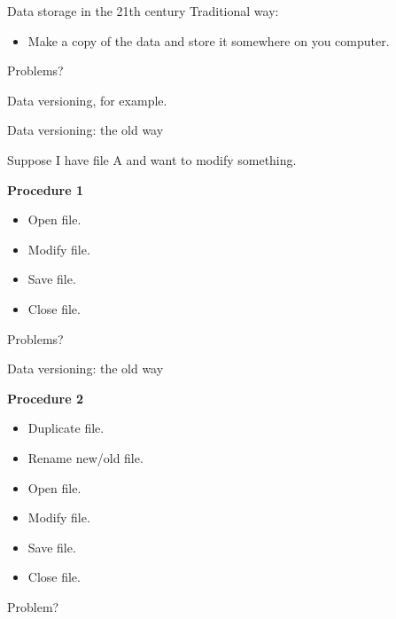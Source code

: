 \documentclass{beamer}
\begin{document}
\begin{frame}{Data storage in the 21th century}
  Traditional way:
  
    \begin{itemize}
      \item Make a copy of the data and store it somewhere on you computer.
    \end{itemize}
 
  \pause
  
  Problems?
  
  {\tiny Data versioning, for example.}

\end{frame}

\begin{frame}{Data versioning: the old way}

  Suppose I have file A and want to modify something.
  
  \textbf{Procedure 1}

  \begin{itemize}
  
    \item Open file.
    \item Modify file.
    \item Save file.
    \item Close file.
  
  \end{itemize}

  Problems?
  
\end{frame}
  
\begin{frame}{Data versioning: the old way}

  \textbf{Procedure 2}
  
  \begin{itemize}
  
    \item Duplicate file.
    \item Rename new/old file.
    \item Open file.
    \item Modify file.
    \item Save file.
    \item Close file.
  
  \end{itemize}

  Problem?

\end{frame}
\end{document}

